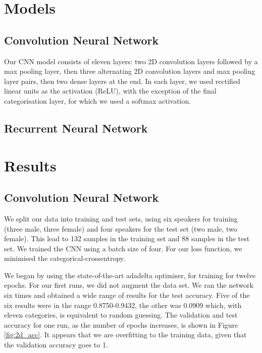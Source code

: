 \section{Models} \label{sec:models}
\subsection{Convolution Neural Network}
Our CNN model consists of eleven layers: two 2D convolution layers followed by a max pooling layer, then three alternating 2D convolution layers and max pooling layer pairs, then two dense layers at the end. In each layer, we used rectified linear units as the activation (ReLU), with the exception of the final categorisation layer, for which we used a softmax activation. 
 
\subsection{Recurrent Neural Network}



\section{Results} \label{sec:results}
\subsection{Convolution Neural Network}
We split our data into training and test sets, using six speakers for training (three male, three female) and four speakers for the test set (two male, two female). This lead to 132 samples in the training set and 88 samples in the test set. We trained the CNN using a batch size of four. For our loss function, we minimised the categorical-crossentropy.

We began by using the state-of-the-art adadelta optimiser, for training for twelve epochs. For our first runs, we did not augment the data set. We ran the network six times and obtained a wide range of results for the test accuracy. Five of the six results were in the range 0.8750-0.9432, the other was 0.0909 which, with eleven categories, is equivalent to random guessing. The validation and test accuracy for one run, as the number of epochs increases, is shown in Figure \ref{fig:2d_acc}. It appears that we are overfitting to the training data, given that the validation accuracy goes to 1. 

